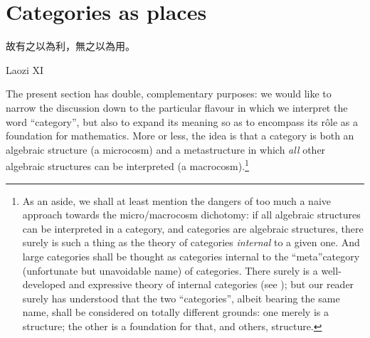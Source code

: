\section{Categories as places}\label{as_places}
\epigraph{\begin{CJK}{UTF8}{bsmi} 故有之以為利，無之以為用。 \end{CJK}}{Laozi XI}
The present section has double, complementary purposes: we would like to narrow the discussion down to the particular flavour in which we interpret the word ``category'', but also to expand its meaning so as to encompass its r\^ole as a foundation for mathematics. More or less, the idea is that a category is both an algebraic structure (a microcosm) and a metastructure in which \emph{all} other algebraic structures can be interpreted (a macrocosm).\footnote{As an aside, we shall at least mention the dangers of too much a naive approach towards the micro/macrocosm dichotomy: if all algebraic structures can be interpreted in a category, and categories are algebraic structures, there surely is such a thing as the theory of categories \emph{internal} to a given one. And large categories shall be thought as categories internal to the ``meta''category (unfortunate but unavoidable name) of categories. There surely is a well-developed and expressive theory of internal categories (see \cite[8]{Bor1}); but our reader surely has understood that the two ``categories'', albeit bearing the same name, shall be considered on totally different grounds: one merely is a structure; the other is a foundation for that, and others, structure.}

